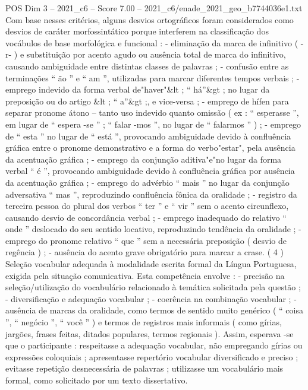 \begin{textsample}{POS Dim 3 – 2021\_c6 – Score 7.00 – 2021\_c6/enade\_2021\_geo\_b7744036e1.txt}
Com base nesses critérios, alguns desvios ortográficos foram considerados como desvios de caráter morfossintático porque interferem na classificação dos vocábulos de base morfológica e funcional : - eliminação da marca de infinitivo ( -r- ) e substituição por acento agudo ou ausência total de marca do infinitivo, causando ambiguidade entre distintas classes de palavras ; - confusão entre as terminações “ ão ” e “ am ”, utilizadas para marcar diferentes tempos verbais ; - emprego indevido da forma verbal de"haver"\&lt ; “ há”\&gt ; no lugar da preposição ou do artigo \&lt ; “ a”\&gt ;, e vice-versa ; - emprego de hífen para separar pronome átono – tanto uso indevido quanto omissão ( ex : “ esperasse ”, em lugar de “ espera -se ” ; “ falar -mos ”, no lugar de “ falarmos ” ) ; - emprego de “ esta ” no lugar de “ está ”, provocando ambiguidade devido à confluência gráfica entre o pronome demonstrativo e a forma do verbo"estar", pela ausência da acentuação gráfica ; - emprego da conjunção aditiva"e"no lugar da forma verbal “ é ”, provocando ambiguidade devido à confluência gráfica por ausência da acentuação gráfica ; - emprego do advérbio “ mais ” no lugar da conjunção adversativa “ mas ”, reproduzindo confluência fônica da oralidade ; - registro da terceira pessoa do plural dos verbos “ ter ” e “ vir ” sem o acento circunflexo, causando desvio de concordância verbal ; - emprego inadequado do relativo “ onde ” deslocado do seu sentido locativo, reproduzindo tendência da oralidade ; - emprego do pronome relativo “ que ” sem a necessária preposição ( desvio de regência ) ; - ausência do acento grave obrigatório para marcar a crase. ( 4 ) Seleção vocabular adequada à modalidade escrita formal da Língua Portuguesa, exigida pela situação comunicativa.
Esta competência envolve : - precisão na seleção/utilização do vocabulário relacionado à temática solicitada pela questão ; - diversificação e adequação vocabular ; - coerência na combinação vocabular ; - ausência de marcas da oralidade, como termos de sentido muito genérico ( “ coisa ”, “ negócio ”, “ você ” ) e termos de registros mais informais ( como gírias, jargões, frases feitas, ditados populares, termos regionais ).
Assim, esperava -se que o participante : respeitasse a adequação vocabular, não empregando gírias ou expressões coloquiais ; apresentasse repertório vocabular diversificado e preciso ; evitasse repetição desnecessária de palavras ; utilizasse um vocabulário mais formal, como solicitado por um texto dissertativo.

\end{textsample}
